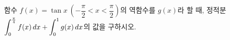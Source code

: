 함수 $f(x)=\tan x\ \left(-\dfrac{\pi}{2}<x<\dfrac{\pi}{2}\right)$의 역함수를 $g(x)$라 할 때, 정적분 $\displaystyle\int_{0}^{\frac{\pi}{4}} f(x)\mkern3mu dx+\int_{0}^{1} g(x)\mkern3mu dx$의 값을 구하시오.
